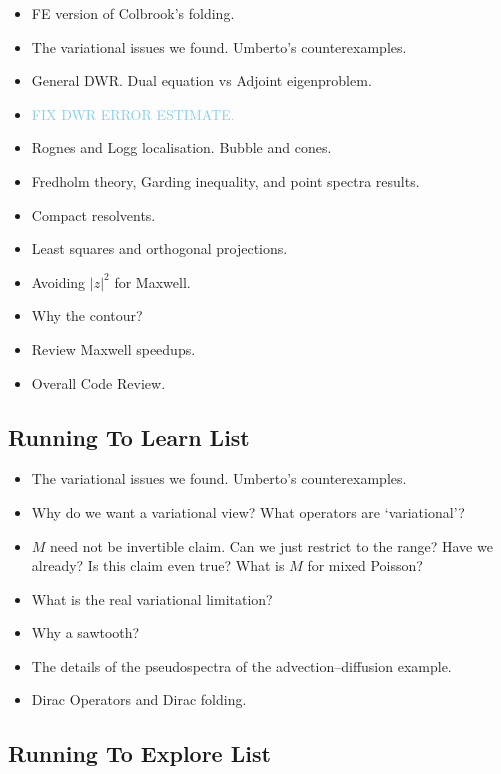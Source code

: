 \documentclass[12pt,a4paper]{article}
\newcommand{\skyblue}[1]{\textcolor{SkyBlue}{#1}}
\begin{document}
\begin{itemize}
    \item FE version of Colbrook's folding.
    \item The variational issues we found. Umberto's counterexamples. 
    \item General DWR. Dual equation vs Adjoint eigenproblem.
    \item \skyblue{FIX DWR ERROR ESTIMATE.}
    \item Rognes and Logg localisation. Bubble and cones. 
    \item Fredholm theory, Garding inequality, and point spectra results. 
    \item Compact resolvents.
    \item Least squares and orthogonal projections.
    \item Avoiding $|z|^2$ for Maxwell. 
    \item Why the contour?
    \item Review Maxwell speedups.
    \item Overall Code Review.
    
\end{itemize}


\subsection{Running To Learn List}

\begin{itemize}
    \item The variational issues we found. Umberto's counterexamples. 
        \item Why do we want a variational view? What operators are `variational'?
    \item $M$ need not be invertible claim. Can we just restrict to the range? Have we already? Is this claim even true? What is $M$ for mixed Poisson? 
    \item What is the real variational limitation? 
    \item Why a sawtooth?
    \item The details of the pseudospectra of the advection--diffusion example. 
    \item Dirac Operators and Dirac folding.
    
\end{itemize}

\subsection{Running To Explore List}
\end{document}
